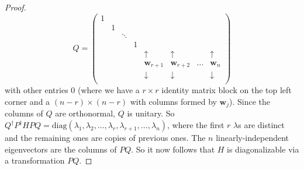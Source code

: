 \documentclass[a4paper]{article}
\begin{document}
\begin{proof}
  \[
    Q =
    \begin{pmatrix}
      1 \\
      & 1\\
      && \ddots\\
      &&& 1\\
      &&&& \uparrow & \uparrow & &\uparrow\\
      &&&& \mathbf{w}_{r+1} & \mathbf{w}_{r + 2} & \dots & \mathbf{w}_n\\
      &&&& \downarrow & \downarrow & &\downarrow\\
    \end{pmatrix}
  \]
  with other entries $0$ (where we have a $r\times r$ identity matrix block on the top left corner and a $(n - r) \times (n -r)$ with columns formed by $\mathbf{w}_j$). Since the columns of $Q$ are orthonormal, $Q$ is unitary. So $Q^\dagger P^\dagger HPQ = \mathrm{diag}(\lambda_1, \lambda_2, \dots, \lambda_r, \lambda_{r + 1}, \dots, \lambda_n)$, where the first $r$ $\lambda$s are distinct and the remaining ones are copies of previous ones.  The $n$ linearly-independent eigenvectors are the columns of $PQ$. So it now follows that $H$ is diagonalizable via a transformation $PQ$.
\end{proof}


\newpage
\end{document}
